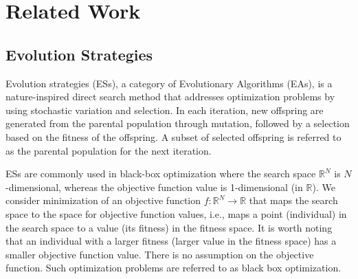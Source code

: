 \section{Related Work}
\subsection{Evolution Strategies}

Evolution strategies (ESs), a category of Evolutionary Algorithms (EAs), is a nature-inspired direct search method that addresses optimization problems by using stochastic variation and selection. In each iteration, new offspring are generated from the parental population through mutation, followed by a selection based on the fitness of the offspring. A subset of selected offspring is referred to as the parental population for the next iteration. 

ESs are commonly used in black-box optimization where the search space $\mathbb{R}^N$ is $N$-dimensional, whereas the objective function value is 1-dimensional (in $\mathbb{R}$). We consider minimization of an objective function $f:\mathbb{R}^N \rightarrow \mathbb{R}$ that maps the search space to the space for objective function values, i.e., maps a point (individual) in the search space to a value (its fitness) in the fitness space. It is worth noting that an individual with a larger fitness (larger value in the fitness space) has a smaller objective function value. There is no assumption on the objective function. Such optimization problems are referred to as black box optimization. 

